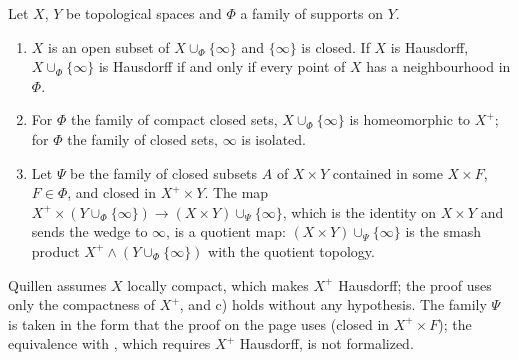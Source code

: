 \begin{encadre}
\begin{theoreme}\label{thm:quillen-1968-13}
Let $X$, $Y$ be topological spaces and $\Phi$ a family of supports on $Y$.
\begin{enumerate}
\item[a)] $X$ is an open subset of $X \cup_\Phi \{\infty\}$ and $\{\infty\}$ is closed. If $X$ is Hausdorff, $X \cup_\Phi \{\infty\}$ is Hausdorff if and only if every point of $X$ has a neighbourhood in $\Phi$.
\item[b)] For $\Phi$ the family of compact closed sets, $X \cup_\Phi \{\infty\}$ is homeomorphic to $X^+$; for $\Phi$ the family of closed sets, $\infty$ is isolated.
\item[c)] Let $\Psi$ be the family of closed subsets $A$ of $X \times Y$ contained in some $X \times F$, $F \in \Phi$, and closed in $X^+ \times Y$. The map $X^+ \times (Y \cup_\Phi \{\infty\}) \to (X \times Y) \cup_\Psi \{\infty\}$, which is the identity on $X \times Y$ and sends the wedge to $\infty$, is a quotient map: $(X \times Y) \cup_\Psi \{\infty\}$ is the smash product $X^+ \wedge (Y \cup_\Phi \{\infty\})$ with the quotient topology.
\end{enumerate}
\end{theoreme}
\end{encadre}

\noindent Quillen assumes $X$ locally compact, which makes $X^+$ Hausdorff; the proof uses only the compactness of $X^+$, and c) holds without any hypothesis. The family $\Psi$ is taken in the form that the proof on the page uses (closed in $X^+ \times F$); the equivalence with , which requires $X^+$ Hausdorff, is not formalized.

